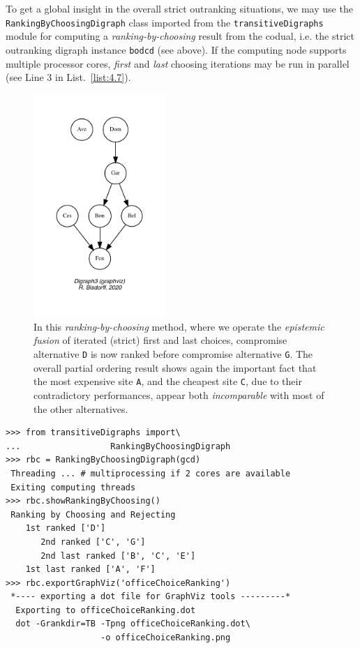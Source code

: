 To get a global insight in the overall strict outranking situations, we may use the \texttt{RankingByChoosingDigraph} class imported from the \texttt{transitive\-Digraphs} module for computing a \emph{ranking-by-choosing} result from the codual, i.e. the strict outranking digraph instance \texttt{bodcd} (see above). If the computing node supports multiple processor cores, \emph{first} and \emph{last} choosing iterations may be run in parallel (see Line 3 in List.~\vref{list:4.7}).
\begin{figure}[ht]
\sidecaption[t]
\includegraphics[width=5cm]{Figures/4-4-officeChoiceRanking.pdf}
\caption{In this \emph{ranking-by-choosing} method, where we operate the \emph{epistemic fusion} of iterated (strict) first and last choices, compromise alternative \texttt{D} is now ranked before compromise alternative \texttt{G}. The overall partial ordering result shows again the important fact that the most expensive site \texttt{A}, and the cheapest site \texttt{C}, due to their contradictory performances, appear both \emph{incomparable} with most of the other alternatives.} 
\label{fig:4.4}       %
\end{figure}
\begin{lstlisting}[caption={Ranking-by-choosing the outranking digraph},label=list:4.7]
>>> from transitiveDigraphs import\
...                  RankingByChoosingDigraph
>>> rbc = RankingByChoosingDigraph(gcd)
 Threading ... # multiprocessing if 2 cores are available
 Exiting computing threads
>>> rbc.showRankingByChoosing()
 Ranking by Choosing and Rejecting
    1st ranked ['D']
       2nd ranked ['C', 'G']
       2nd last ranked ['B', 'C', 'E']
    1st last ranked ['A', 'F']
>>> rbc.exportGraphViz('officeChoiceRanking')
 *---- exporting a dot file for GraphViz tools ---------*
  Exporting to officeChoiceRanking.dot
  dot -Grankdir=TB -Tpng officeChoiceRanking.dot\
                   -o officeChoiceRanking.png
\end{lstlisting}

